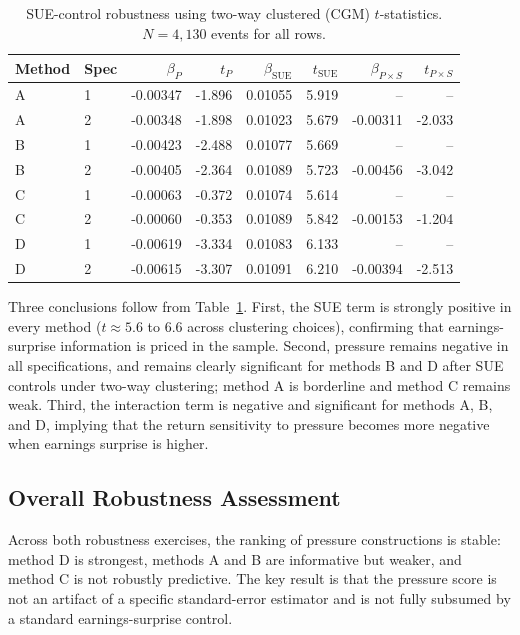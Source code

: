 \begin{table}[!t]
\centering
\caption{SUE-control robustness using two-way clustered (CGM) $t$-statistics.
$N=4{,}130$ events for all rows.}
\label{tab:robust_sue}
\small
\begin{tabular}{llrrrrrr}
\hline
Method & Spec & $\beta_P$ & $t_P$ & $\beta_{\mathrm{SUE}}$ & $t_{\mathrm{SUE}}$ & $\beta_{P\times S}$ & $t_{P\times S}$ \\
\hline
A & 1 & -0.00347 & -1.896 & 0.01055 & 5.919 & -- & -- \\
A & 2 & -0.00348 & -1.898 & 0.01023 & 5.679 & -0.00311 & -2.033 \\
B & 1 & -0.00423 & -2.488 & 0.01077 & 5.669 & -- & -- \\
B & 2 & -0.00405 & -2.364 & 0.01089 & 5.723 & -0.00456 & -3.042 \\
C & 1 & -0.00063 & -0.372 & 0.01074 & 5.614 & -- & -- \\
C & 2 & -0.00060 & -0.353 & 0.01089 & 5.842 & -0.00153 & -1.204 \\
D & 1 & -0.00619 & -3.334 & 0.01083 & 6.133 & -- & -- \\
D & 2 & -0.00615 & -3.307 & 0.01091 & 6.210 & -0.00394 & -2.513 \\
\hline
\end{tabular}
\end{table}

Three conclusions follow from Table~\ref{tab:robust_sue}. First, the SUE term is
strongly positive in every method ($t\approx 5.6$ to $6.6$ across clustering
choices), confirming that earnings-surprise information is priced in the sample.
Second, pressure remains negative in all specifications, and remains clearly
significant for methods B and D after SUE controls under two-way clustering;
method A is borderline and method C remains weak. Third, the interaction term is
negative and significant for methods A, B, and D, implying that the return
sensitivity to pressure becomes more negative when earnings surprise is higher.

\subsection{Overall Robustness Assessment}

Across both robustness exercises, the ranking of pressure constructions is
stable: method D is strongest, methods A and B are informative but weaker, and
method C is not robustly predictive. The key result is that the pressure score
is not an artifact of a specific standard-error estimator and is not fully
subsumed by a standard earnings-surprise control.

